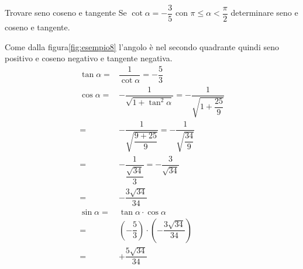 \begin{esempiot}{Trovare seno coseno e tangente}{}
	Se $\cot\alpha=-\dfrac{3}{5}$ con $\pi\leq\alpha<\dfrac{\pi}{2}$ determinare seno e coseno e tangente.
\end{esempiot}
Come dalla figura\nobs\vref{fig:esempio8} l'angolo è nel secondo quadrante quindi seno positivo e coseno negativo e tangente negativa.
\begin{align*}
\tan\alpha=&\dfrac{1}{\cot\alpha}=-\dfrac{5}{3}\\
\cos\alpha=&-\dfrac{1}{\sqrt{1+\tan^2\alpha}}=-\dfrac{1}{\sqrt{1+\dfrac{25}{9}}}\\
=&-\dfrac{1}{\sqrt{\dfrac{9+25}{9}}}=-\dfrac{1}{\sqrt{\dfrac{34}{9}}}\\
=&-\dfrac{1}{\dfrac{\sqrt{34}}{3}}=-\dfrac{3}{\sqrt{34}}\\
=&-\dfrac{3\sqrt{34}}{34}\\
\sin\alpha=&\tan\alpha\cdot\cos\alpha\\
=&\left(-\dfrac{5}{3}\right)\cdot\left(-\dfrac{3\sqrt{34}}{34}\right)\\
=&+
\dfrac{5\sqrt{34}}{34}\\ 
\end{align*}
